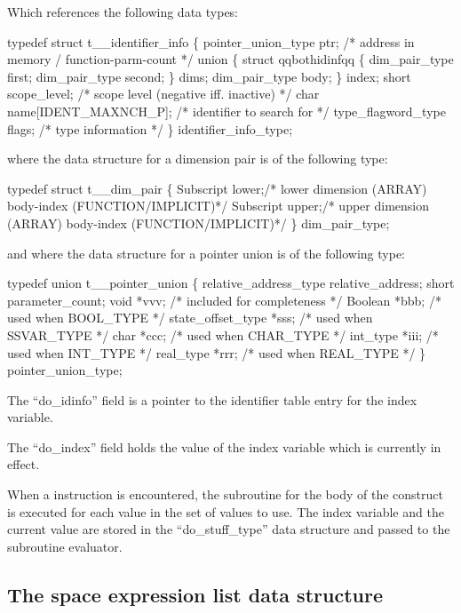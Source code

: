 Which references the following data types:
\begin{codeexample}
typedef struct t__identifier_info
  \{
     pointer_union_type ptr;    /* address in memory / function-parm-count */
     union
        \{
           struct qqbothidinfqq
              \{
                 dim_pair_type first;
                 dim_pair_type second;
              \} dims;
           dim_pair_type body;
        \} index;
     short scope_level;         /* scope level (negative iff. inactive) */
     char name[IDENT_MAXNCH_P]; /* identifier to search for */
     type_flagword_type flags;  /* type information */
  \} identifier_info_type;
\end{codeexample}
where the data structure for a dimension pair is of the following type:
\begin{codeexample}
typedef struct t__dim_pair
  \{
    Subscript lower;/* lower dimension (ARRAY) body-index (FUNCTION/IMPLICIT)*/
    Subscript upper;/* upper dimension (ARRAY) body-index (FUNCTION/IMPLICIT)*/
  \} dim_pair_type;
\end{codeexample}

and where the data structure for a pointer union is of the following type:
\begin{codeexample}
typedef union t__pointer_union
   \{
     relative_address_type relative_address;
     short parameter_count;
     void *vvv;               /* included for completeness */
     Boolean *bbb;            /* used when BOOL_TYPE */
     state_offset_type *sss;  /* used when SSVAR_TYPE */
     char *ccc;               /* used when CHAR_TYPE */
     int_type *iii;           /* used when INT_TYPE */
     real_type *rrr;          /* used when REAL_TYPE */
   \} pointer_union_type;
\end{codeexample}



The ``do\_idinfo'' field is a pointer to the identifier table entry for
the  index variable.

The ``do\_index'' field holds the value of the index variable which is
currently in effect.

When a  instruction is encountered, the subroutine for the body
of the construct is executed for each value in the set of values to use.
The index variable and the current value are stored in
the ``do\_stuff\_type'' data structure and passed to the subroutine
evaluator.

\subsection{The space expression list data structure}
\label{sec:elist}

